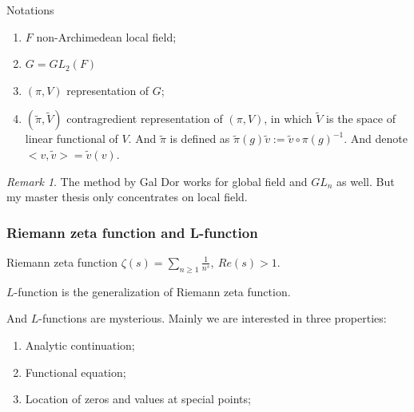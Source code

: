 \documentclass[aspectratio=169]{beamer}
\theoremstyle{plain}
\theoremstyle{definition}
\theoremstyle{remark}
\newtheorem*{rem}{Remark}
\begin{document}
\begin{frame}{Notations}
\begin{enumerate}
    \item     $F$ non-Archimedean  local field;
    \item  $G=GL_{2}(F)$
    \item $(\pi, V)$ representation of $G$;
    \item $(\tilde{\pi}, \widetilde{V})$ contragredient representation of $(\pi, V)$, in which $\widetilde{V}$ is the space of linear functional of $V$. And $\tilde{\pi}$ is defined as $\tilde{\pi}(g)\tilde{v}:=\tilde{v}\circ \pi(g)^{-1}$. And denote $<v,\tilde{v}>=\tilde{v}(v)$.
\end{enumerate}
\begin{rem}
The method by Gal Dor works for global field and $GL_{n}$ as well. But my master thesis only concentrates on local field. 
\end{rem}
\end{frame}
\begin{frame}
\frametitle{Riemann zeta function and L-function}
Riemann zeta function $\zeta(s)=\sum_{n\geq 1} \frac{1}{n^{s}},\ Re(s)>1$.  

\vspace{0.5 cm}

$L$-function is the generalization of Riemann zeta function.

\vspace{0.5 cm}

And $L$-functions are mysterious. Mainly we are interested in three properties:
\begin{enumerate}
    \item Analytic continuation;
    \item Functional equation;
    \item Location of zeros and values at special points;
\end{enumerate}
\end{frame}
\end{document}
